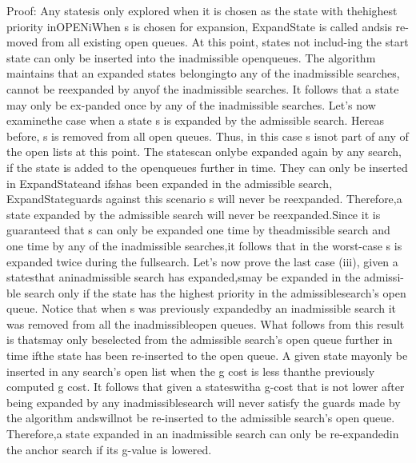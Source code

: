 \documentclass[a4paper]{article}
\begin{document}
Proof: Any statesis only explored when it is chosen as the state with thehighest priority inOPENiWhen s is chosen for expansion, ExpandState is called andsis re-moved from all existing open queues. At this point, states not includ-ing the start state can only be inserted into the inadmissible openqueues. The algorithm maintains that an expanded states belongingto any of the inadmissible searches, cannot be reexpanded by anyof the inadmissible searches. It follows that a state may only be ex-panded once by any of the inadmissible searches. Let’s now examinethe case when a state s is expanded by the admissible search. Hereas before, s is removed from all open queues. Thus, in this case s isnot part of any of the open lists at this point. The statescan onlybe expanded again by any search, if the state is added to the openqueues further in time. They can only be inserted in ExpandStateand ifshas been expanded in the admissible search, ExpandStateguards against this scenario s will never be reexpanded. Therefore,a state expanded by the admissible search will never be reexpanded.Since it is guaranteed that s can only be expanded one time by theadmissible search and one time by any of the inadmissible searches,it follows that in the worst-case s is expanded twice during the fullsearch. Let’s now prove the last case (iii), given a statesthat aninadmissible search has expanded,smay be expanded in the admissi-ble search only if the state has the highest priority in the admissiblesearch’s open queue. Notice that when s was previously expandedby an inadmissible search it was removed from all the inadmissibleopen queues. What follows from this result is thatsmay only beselected from the admissible search’s open queue further in time ifthe state has been re-inserted to the open queue. A given state mayonly be inserted in any search’s open list when the g cost is less thanthe previously computed g cost. It follows that given a stateswitha g-cost that is not lower after being expanded by any inadmissiblesearch will never satisfy the guards made by the algorithm andswillnot be re-inserted to the admissible search’s open queue. Therefore,a state expanded in an inadmissible search can only be re-expandedin the anchor search if its g-value is lowered.
\end{document}
